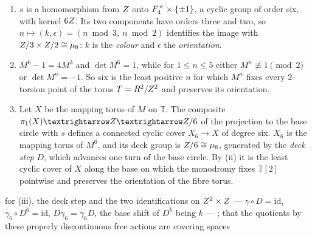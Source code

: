 \begin{theorem}\label{thm:fibre-mu6}
\begin{enumerate}[label=\textup{(\roman*)}]
  \item $s$ is a homomorphism from $Z$ onto $F_4^\times\times\{\pm1\}$, a cyclic group of order six, with kernel
    $6Z$.  Its two components have orders three and two, so $n\mapsto(k,\epsilon)=(n\bmod3,\ n\bmod2)$ identifies
    the image with $Z/3\times Z/2\cong\mu_6$: $k$ is the \emph{colour} and $\epsilon$ the \emph{orientation}.
  \item $M^6-1=4M^3$ and $\det M^6=1$, while for $1\le n\le5$ either $M^n\not\equiv1\pmod2$ or $\det M^n=-1$.  So six
    is the least positive $n$ for which $M^n$ fixes every $2$-torsion point of the torus
    $T=R^2/Z^2$ and preserves its orientation.
  \item Let $X$ be the mapping torus of $M$ on $\mathbb T$.  The composite $\pi_1(X)\to\Z\to\Z/6$ of the projection
    to the base circle with $s$ defines a connected cyclic cover $X_6\to X$ of degree six.  $X_6$ is the mapping
    torus of $M^6$, and its deck group is $Z/6\cong\mu_6$, generated by the \emph{deck step} $D$, which advances one
    turn of the base circle.  By \textup{(ii)} it is the least cyclic cover of $X$ along the base on which the
    monodromy fixes $\mathbb T[2]$ pointwise and preserves the orientation of the fibre torus.
\end{enumerate}


for (iii), the deck step and the two
identifications on $Z^2\times Z$ --- $\gamma\circ D=\mathrm{id}$,
$\gamma_6\circ D^6=\mathrm{id}$, $D\gamma_6=\gamma_6D$, the base shift of $D^k$ being $k$ --- ; that the
quotients by these properly discontinuous free actions are covering spaces
\end{theorem}

